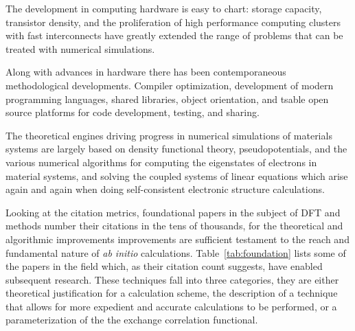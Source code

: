   The development in computing hardware is easy to chart: storage capacity, transistor density,
and the proliferation of high performance computing clusters with fast interconnects have
greatly extended the range of problems that can be treated with numerical simulations.

Along with advances in hardware there has been contemporaneous methodological developments.
Compiler optimization, development of modern programming languages, shared libraries, object orientation,
and tsable open source platforms for code development, testing, and sharing.

The theoretical engines driving progress in numerical simulations of materials systems are
largely based on density functional theory, pseudopotentials, and the various numerical algorithms
for computing the eigenstates of electrons in material systems, and solving the coupled systems
of linear equations which arise again and again when doing self-consistent electronic structure calculations.

Looking at the citation metrics, foundational papers in the subject
of DFT and methods number their citations in the tens of thousands, for the 
theoretical and algorithmic improvements improvements are sufficient testament 
to the reach and fundamental nature of {\it ab initio} calculations. 
Table~\ref{tab:foundation} lists some of the papers in the field which, as
their citation count suggests, have enabled subsequent research. These techniques fall into
three categories, they are either theoretical justification for a calculation scheme, the description of
a technique that allows for more expedient and accurate calculations to be performed, or a parameterization
of the the exchange correlation functional.

